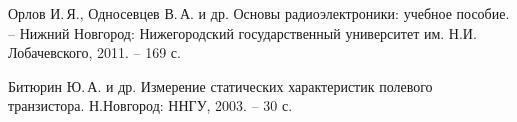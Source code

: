 \documentclass[a4paper,14pt]{extarticle}
\begin{document}
\begin{thebibliography}{}
   Орлов И.\,Я., Односевцев В.\,А. и др. Основы радиоэлектроники: учебное пособие. -- Нижний Новгород: Нижегородский государственный университет им. Н.И. Лобачевского, 2011. -- 169 с.
  
   Битюрин\,\,Ю.\,А. и др. Измерение статических характеристик полевого транзистора. Н.Новгород: ННГУ, 2003. -- 30 с.
  
\end{thebibliography}
\end{document}
